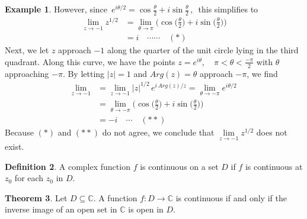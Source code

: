 \documentclass[11pt,a4paper]{article}
\theoremstyle{definition}
\newtheorem{thm}{Theorem}[section]
\newtheorem{definition}[thm]{Definition}
\newtheorem{example}[thm]{Example}
\begin{document}
\begin{example}
However, since $\,\displaystyle{e^{i\theta/2} = \cos \frac{\theta}{2} + i \sin \frac{\theta}{2}}\,,\,$ this simplifies to 
\begin{align*}
\lim\limits_{z\rightarrow -1}z^{1/2} & = \lim\limits_{\theta\rightarrow \pi}\Big( \cos \big(\frac{\theta}{2}\big) + i \sin \big(\frac{\theta}{2}\big)\Big)\\
& = i\quad \cdots \cdots\quad  (*)
\end{align*}
Next, we let $z$ approach $-1$ along the quarter of the unit circle lying in the third quadrant. Along this curve, we have the points $z = e^{i\theta}, \quad  \pi < \theta < \frac{-\pi}{2}$ with $\theta$  approaching $-\pi$. By letting $\left|z\right| = 1$ and $Arg(z) = \theta$ approach $-\pi$, we find
\begin{align*}
\lim\limits_{z\rightarrow -1} & = \lim\limits_{z\rightarrow -1}\left|z\right|^{1/2}\,e^{i\,Arg(z)/z} = \lim\limits_{\theta\rightarrow -\pi}e^{i\theta /2}\\
& = \lim\limits_{\theta\rightarrow -\pi}\Big(\cos\Big(\frac{\theta}{2}\Big) + i \sin \Big(\frac{\theta}{2}\Big)\Big)\\
& = -i\quad \cdots\quad  (**)
\end{align*}
Because $(*)$ and $(**)$ do not agree, we conclude that $\lim\limits_{z\rightarrow -1}z^{1/2}$ does not exist.
\end{example}

\begin{definition}
A complex function $f$ is continuous on a set $D$ if $f$ is continuous at $z_0$ for each $z_0$ in $D$.
\end{definition}

\begin{thm}
Let $D\subseteq \mathbb{C}$. A function $f: D\longrightarrow \mathbb{C}$ is  continuous if and only if the inverse image of an open set in $\mathbb{C}$ is open in $D$.
\end{thm}
\end{document}
